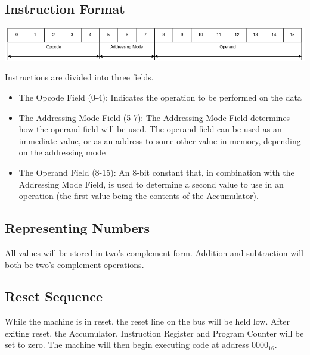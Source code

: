 \documentclass[11pt]{article}
\begin{document}
    \subsection{Instruction Format}\label{subsec:instruction-format}
    \begin{center}
        \includegraphics[scale=0.40]{Instruction_Format}
    \end{center}
    \par Instructions are divided into three fields.
    \begin{itemize}
        \item The Opcode Field (0-4): Indicates the operation to be performed on the data
        \item The Addressing Mode Field (5-7): The Addressing Mode Field determines how the operand field will be used.
        The operand field can be used as an immediate value, or as an address to some other value in memory,
        depending on the addressing mode
        \item The Operand Field (8-15): An 8-bit constant that, in combination with the Addressing Mode Field, is
        used to determine a second value to use in an operation (the first value being the contents of the Accumulator).
    \end{itemize}

    \subsection{Representing Numbers}\label{subsec:representing-numbers}
    \par All values will be stored in two's complement form.
    Addition and subtraction will both be two's complement operations.

    


    \subsection{Reset Sequence}\label{subsec:reset-sequence}
    \par While the machine is in reset, the reset line on the bus will be held low.
    After exiting reset, the Accumulator, Instruction Register and Program Counter will
    be set to zero.
    The machine will then begin executing code at address $0000_{16}$.
\end{document}
